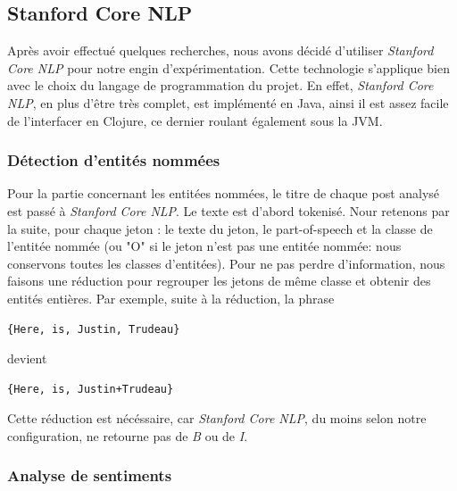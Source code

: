 \documentclass[12pt]{article}
\begin{document}
\subsection{Stanford Core NLP}

Après avoir effectué quelques recherches, nous avons décidé d'utiliser \textit{Stanford Core NLP} pour notre engin d'expérimentation. Cette technologie s'applique bien avec le choix du langage de programmation du projet. En effet, \textit{Stanford Core NLP}, en plus d'être très complet, est implémenté en Java, ainsi il est assez facile de l'interfacer en Clojure, ce dernier roulant également sous la JVM.

\subsubsection{Détection d'entités nommées}
\label{sec:named-entities}

Pour la partie concernant les entitées nommées, le titre de chaque post analysé est passé à \textit{Stanford Core NLP}. Le texte est d'abord tokenisé. Nour retenons par la suite, pour chaque jeton : le texte du jeton, le part-of-speech et la classe de l'entitée nommée (ou "O" si le jeton n'est pas une entitée nommée: nous conservons toutes les classes d'entitées). Pour ne pas perdre d'information, nous faisons une réduction pour regrouper les jetons de même classe et obtenir des entités entières. Par exemple, suite à la réduction, la phrase

\begin{verbatim}
{Here, is, Justin, Trudeau}
\end{verbatim}

devient

\begin{verbatim}
{Here, is, Justin+Trudeau}
\end{verbatim}

Cette réduction est nécéssaire, car \textit{Stanford Core NLP}, du moins selon notre configuration, ne retourne pas de \textit{B} ou de \textit{I}.

\subsubsection{Analyse de sentiments}
\label{sec:sentiment-analysis}
\end{document}
